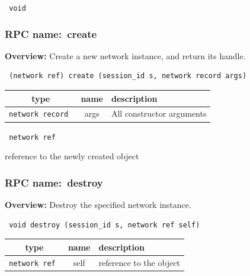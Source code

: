 \vspace{0.3cm}

{\tt 
void
}



\vspace{0.3cm}
\vspace{0.3cm}
\vspace{0.3cm}
\subsubsection{RPC name:~create}

{\bf Overview:} 
Create a new network instance, and return its handle.

\begin{verbatim} (network ref) create (session_id s, network record args)\end{verbatim}



 
\vspace{0.3cm}
\begin{tabular}{|c|c|p{7cm}|}
 \hline
{\bf type} & {\bf name} & {\bf description} \\ \hline
{\tt network record } & args & All constructor arguments \\ \hline 

\end{tabular}

\vspace{0.3cm}

{\tt 
network ref
}


reference to the newly created object
\vspace{0.3cm}
\vspace{0.3cm}
\vspace{0.3cm}
\subsubsection{RPC name:~destroy}

{\bf Overview:} 
Destroy the specified network instance.

\begin{verbatim} void destroy (session_id s, network ref self)\end{verbatim}



 
\vspace{0.3cm}
\begin{tabular}{|c|c|p{7cm}|}
 \hline
{\bf type} & {\bf name} & {\bf description} \\ \hline
{\tt network ref } & self & reference to the object \\ \hline 

\end{tabular}

